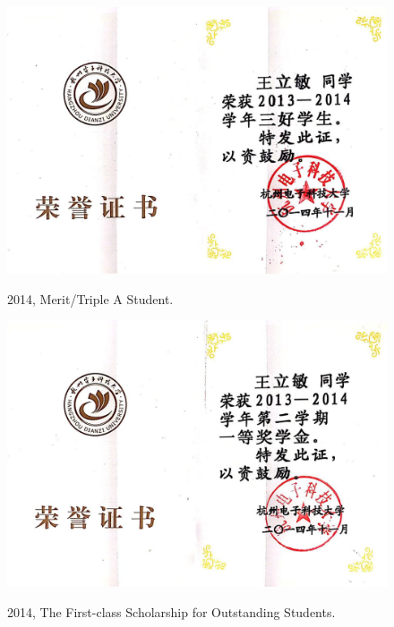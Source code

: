 \documentclass[11pt]{article}
\begin{document}
{\begin{figure}[ht]
	\centering
	\includegraphics[width=14cm]{fig/cer7.jpg}\\
	\caption{2014, Merit/Triple A Student.}
\end{figure}

\begin{figure}[ht]
	\centering
	\includegraphics[width=14cm]{fig/cer8.jpg}\\
	\caption{2014, The First-class Scholarship for Outstanding Students.}
\end{figure}

}
\end{document}
